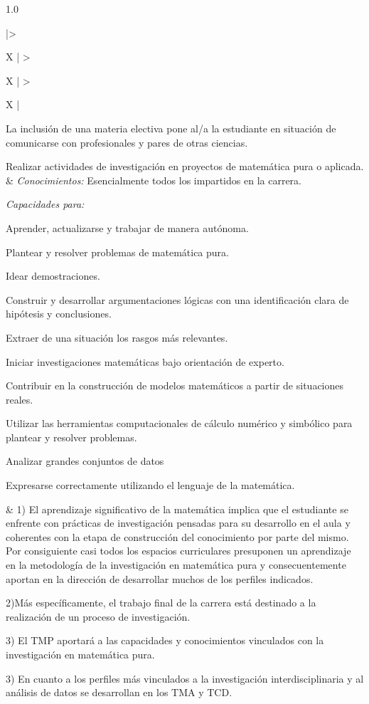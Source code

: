 \documentclass[a4paper, 12pt]{article}
\begin{document}
\begin{center}
\begin{xltabular}{1.0\textwidth}{|>{\raggedright\arraybackslash}X |
>{\raggedright\arraybackslash}X |
>{\raggedright\arraybackslash}X |
}
 La inclusión de una materia electiva pone al/a la estudiante en situación de comunicarse con profesionales y pares de otras ciencias.
 \\ \hline
    

  Realizar actividades de investigación en proyectos de matemática pura o aplicada.
  & 
  \emph{Conocimientos:}  Esencialmente todos los impartidos en la carrera.
  
  \emph{Capacidades para:}
  
   Aprender, actualizarse y trabajar de manera autónoma.
   
  Plantear y resolver problemas de matemática pura.
  
 Idear demostraciones.

  Construir y desarrollar argumentaciones lógicas con
una identificación clara de hipótesis y conclusiones.

Extraer de una situación los rasgos más
relevantes.

Iniciar investigaciones matemáticas bajo orientación
de experto.


 Contribuir en la construcción de modelos matemáticos a partir de situaciones reales.
 
Utilizar las herramientas computacionales de cálculo
numérico y simbólico para plantear y resolver problemas.

Analizar grandes conjuntos de datos

Expresarse correctamente utilizando el lenguaje de la matemática.

  
  
  &  1) El aprendizaje significativo de la matemática implica que el estudiante se enfrente con prácticas de investigación pensadas para su desarrollo en el aula y coherentes con  la etapa de construcción del conocimiento por parte del mismo. Por consiguiente casi todos los espacios curriculares presuponen un aprendizaje en la metodología de la investigación en matemática pura y consecuentemente aportan en la dirección de desarrollar muchos de los perfiles indicados.
  
  2)Más específicamente, el trabajo final de la carrera está destinado a la realización de un proceso de investigación.
  
  3) El TMP aportará a las capacidades y conocimientos vinculados con la investigación en matemática pura. 
  
  3) En cuanto a los perfiles más vinculados a la investigación interdisciplinaria y al análisis de datos se desarrollan en los TMA y TCD. \\ \hline


\end{xltabular}
\end{center}
\end{document}

